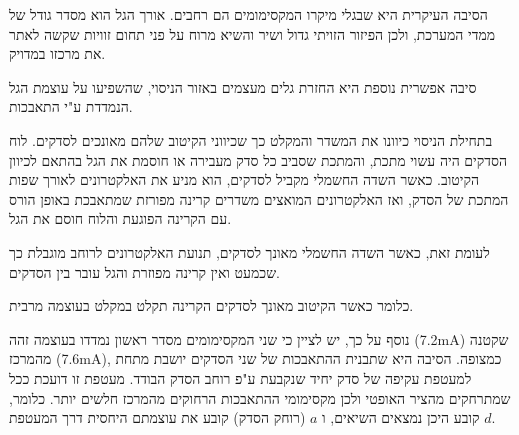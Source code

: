 \documentclass[14pt]{extarticle}
\begin{document}
הסיבה העיקרית היא שבגלי מיקרו המקסימומים הם רחבים. אורך הגל הוא מסדר גודל של ממדי המערכת,
ולכן הפיזור הזויתי גדול ושיר והשיא מרוח על פני תחום זוויות שקשה לאתר את מרכזו במדויק.

סיבה אפשרית נוספת היא החזרת גלים מעצמים באזור הניסוי, שהשפיעו על עוצמת הגל הנמדדת ע"י התאבכות.

בתחילת הניסוי כיוונו את המשדר והמקלט כך שכיווני הקיטוב שלהם מאונכים לסדקים.
לוח הסדקים היה עשוי מתכת, והמתכת שסביב כל סדק מעבירה או חוסמת את הגל בהתאם לכיוון הקיטוב.
כאשר השדה החשמלי מקביל לסדקים, הוא מניע את האלקטרונים לאורך שפות המתכת של הסדק,
 ואז האלקטרונים המואצים משדרים קרינה מפורזת שמתאבכת באופן הורס עם הקרינה הפוגעת והלוח חוסם את הגל.

 לעומת זאת, כאשר השדה החשמלי מאונך לסדקים, תנועת האלקטרונים לרוחב מוגבלת כך שכמעט ואין קרינה מפוזרת והגל עובר בין הסדקים.

 כלומר כאשר הקיטוב מאונך לסדקים הקרינה תקלט במקלט בעוצמה מרבית.

נוסף על כך, יש לציין כי שני המקסימומים מסדר ראשון נמדדו בעוצמה זהה (7.2mA) שקטנה מהמרכז (7.6mA), כמצופה.
הסיבה היא שתבנית ההתאבכות של שני הסדקים יושבת מתחת למעטפת עקיפה של סדק יחיד שנקבעת ע"פ רוחב הסדק הבודד.
מעטפת זו דועכת ככל שמתרחקים מהציר האופטי ולכן מקסימומי ההתאבכות הרחוקים מהמרכז חלשים יותר.
כלומר, $d$ קובע היכן נמצאים השיאים, ו $a$ (רוחק הסדק) קובע את עוצמתם היחסית דרך המעטפת.
\end{document}
